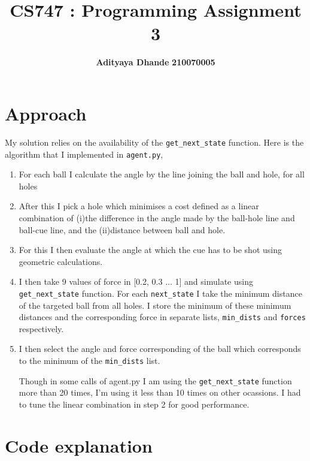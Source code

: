 \documentclass[11pt]{article}
\title{\textbf{CS747 : Programming Assignment 3}}
\author{\textbf{Adityaya Dhande}   \hspace{8mm} \textbf{210070005}}
\begin{document}
\maketitle

\section*{Approach}
My solution relies on the availability of the \texttt{get\_next\_state} function. 
Here is the algorithm that I implemented in \texttt{agent.py}, 
\begin{enumerate}
    \item For each ball I calculate the angle by the line joining the ball and hole, for all holes
    \item After this I pick a hole which minimises a cost defined as a linear combination of (i)the
    difference in the angle made by the ball-hole line and ball-cue line, and the (ii)distance between ball and hole.
    \item For this I then evaluate the angle at which the cue has to be shot using geometric calculations.
    \item I then take 9 values of force in [0.2, 0.3 $\dots$ 1] and simulate using \texttt{get\_next\_state} function.
    For each \texttt{next\_state} I take the minimum distance of the targeted ball from all holes. I store the minimum of these minimum distances and the corresponding force  
    in separate lists, \texttt{min\_dists} and \texttt{forces} respectively. 
    \item I then select the angle and force corresponding of the ball which corresponds to the 
    minimum of the \texttt{min\_dists} list.

Though in some calls of agent.py I am using the \texttt{get\_next\_state} function more than 
20 times, I'm using it less than 10 times on other ocassions.
I had to tune the linear combination in step 2 for good performance.
\end{enumerate}

\section*{Code explanation}
\end{document}
